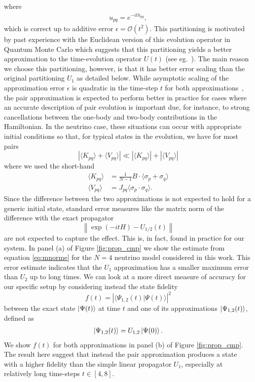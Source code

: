 \documentclass[Dual]{msu-thesis}
\begin{document}
where
\begin{align}
u_{pq} = e^{-ith_{pq}}
,\end{align}
which is correct up to additive error $\epsilon=\mathcal{O}(t^2)$.
This partitioning is motivated by past experience with the Euclidean version of this evolution operator in Quantum Monte Carlo which suggests that this partitioning yields a better approximation to the time-evolution operator $U(t)$ (see eg.~\cite{Ceperley1995,Carlson2015}). The main reason we choose this partitioning, however, is that it has better error scaling than the original partitioning $U_1$ 
as detailed below. While asymptotic scaling of the approximation error $\epsilon$ is quadratic in the time-step $t$ for both approximations~\cite{Suzuki91}, the pair approximation is expected to perform better in practice for cases where an accurate description of pair evolution is important due, for instance, to strong cancellations between the one-body and two-body contributions in the Hamiltonian. In the neutrino case, these situations can occur with appropriate initial conditions so that, for typical states in the evolution, we have for most pairs
\begin{equation}
\label{eq:pairp_err}
\left|\langle K_{pq}\rangle+\langle V_{pq}\rangle\right|\ll\left|\langle K_{pq}\rangle\right|+\left|\langle V_{pq}\rangle\right|
\end{equation}
where we used the short-hand
\begin{align}
\langle K_{pq}\rangle 
&=
\frac{1}{N-1}B\cdot\langle\sigma_p+\sigma_q\rangle
\\
\langle V_{pq}\rangle
&=
J_{pq}\langle\sigma_p\cdot\sigma_q\rangle
.\end{align}
Since the difference between the two approximations is not expected to hold for a generic initial state, standard error measures like the matrix norm of the difference with the exact propagator
\begin{equation}
\label{eq:mnorme}
\left\|\exp\left(-itH\right)-U_{1/2}(t)\right\|
\end{equation}
are not expected to capture the effect. This is, in fact, found in practice for our system. In panel (a) of Figure \ref{fig:prop_cmp} we show the estimate from equation \eqref{eq:mnorme} for the $N=4$ neutrino model considered in this work. This error estimate indicates that the $U_1$ approximation has a smaller maximum error than $U_2$ up to long times. We can look at a more direct measure of accuracy for our specific setup by considering instead the state fidelity 
\begin{equation}
f(t) = \left|\langle \Psi_{1,2}(t)|\Psi(t)\rangle\right|^2   
\end{equation}
between the exact state $\ket{\Psi(t)}$ at time $t$ and one of its approximations $\ket{\Psi_{1,2}(t)}$, defined as
\begin{align}
\ket{\Psi_{1,2}(t)}=U_{1,2}\ket{\Psi(0)}
.\end{align}
We show $f(t)$ for both approximations in panel (b) of Figure \ref{fig:prop_cmp}. The result here suggest that instead the pair approximation produces a state with a higher fidelity than the simple linear propagator $U_1$, especially at relatively long time-steps $t\in[4,8]$.
\end{document}
